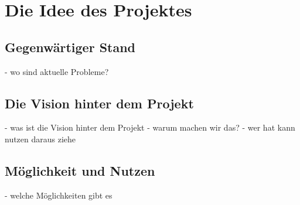 \chapter{Die Idee des Projektes}

\section{Gegenwärtiger Stand}
- wo sind aktuelle Probleme? 

\section{Die Vision hinter dem Projekt}
- was ist die Vision hinter dem Projekt
- warum machen wir das? 
- wer hat kann nutzen daraus ziehe

\section{Möglichkeit und Nutzen}
- welche Möglichkeiten gibt es 